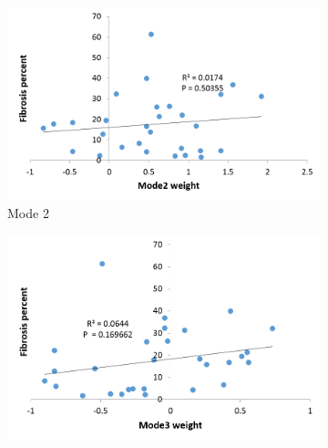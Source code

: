 \begin{figure}[H]
\begin{subfigure}{.65\linewidth}
  \includegraphics[width=\linewidth,trim={{.0\wd0} {.0\wd0} {.0\wd0} {.0\wd0}},clip]{QuantitativeAnalysis/Image/Mode2AgainstFibrosis.png}
  \caption{Mode 2}
  \label{fig:ShapeVSFibrosis-b}
\end{subfigure}
\begin{subfigure}{.65\linewidth}%
  \includegraphics[width=\linewidth,trim={{.0\wd0} {.0\wd0} {.0\wd0} {.0\wd0}},clip]{QuantitativeAnalysis/Image/Mode3AgainstFibrosis.png}

\end{subfigure}
\end{figure}
